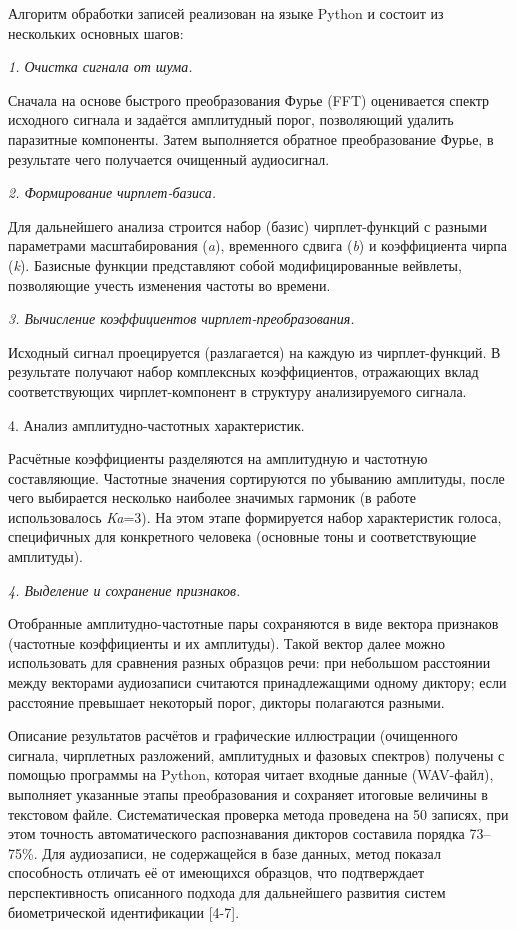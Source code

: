 Алгоритм обработки записей реализован на языке Python и состоит из
нескольких основных шагов:

\emph{1. Очистка сигнала от шума.}

Сначала на основе быстрого преобразования Фурье (FFT) оценивается спектр
исходного сигнала и задаётся амплитудный порог, позволяющий удалить
паразитные компоненты. Затем выполняется обратное преобразование Фурье,
в результате чего получается очищенный аудиосигнал.

\emph{2. Формирование чирплет-базиса.}

Для дальнейшего анализа строится набор (базис) чирплет-функций с разными
параметрами масштабирования (\emph{a}), временного сдвига (\emph{b}) и
коэффициента чирпа (\emph{k}). Базисные функции представляют собой
модифицированные вейвлеты, позволяющие учесть изменения частоты во
времени.

\emph{3. Вычисление коэффициентов чирплет-преобразования.}

Исходный сигнал проецируется (разлагается) на каждую из чирплет-функций.
В результате получают набор комплексных коэффициентов, отражающих вклад
соответствующих чирплет-компонент в структуру анализируемого сигнала.

4. Анализ амплитудно-частотных характеристик.

Расчётные коэффициенты разделяются на амплитудную и частотную
составляющие. Частотные значения сортируются по убыванию амплитуды,
после чего выбирается несколько наиболее значимых гармоник (в работе
использовалось \emph{Ka}=3). На этом этапе формируется набор
характеристик голоса, специфичных для конкретного человека (основные
тоны и соответствующие амплитуды).

\emph{4. Выделение и сохранение признаков.}

Отобранные амплитудно-частотные пары сохраняются в виде вектора
признаков (частотные коэффициенты и их амплитуды). Такой вектор далее
можно использовать для сравнения разных образцов речи: при небольшом
расстоянии между векторами аудиозаписи считаются принадлежащими одному
диктору; если расстояние превышает некоторый порог, дикторы полагаются
разными.

Описание результатов расчётов и графические иллюстрации (очищенного
сигнала, чирплетных разложений, амплитудных и фазовых спектров) получены
с помощью программы на Python, которая читает входные данные (WAV-файл),
выполняет указанные этапы преобразования и сохраняет итоговые величины в
текстовом файле. Систематическая проверка метода проведена на 50
записях, при этом точность автоматического распознавания дикторов
составила порядка 73--75\%. Для аудиозаписи, не содержащейся в базе
данных, метод показал способность отличать её от имеющихся образцов, что
подтверждает перспективность описанного подхода для дальнейшего развития
систем биометрической идентификации {[}4-7{]}.

